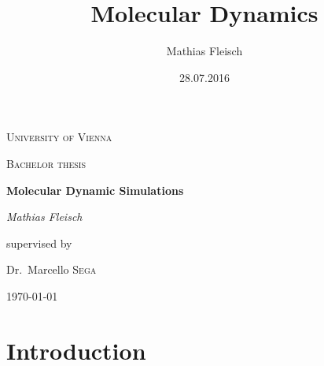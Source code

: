 \documentclass[a4paper]{article}
\title{Molecular Dynamics}
\date{28.07.2016}
\author{Mathias Fleisch}
\begin{document}
\begin{titlepage}
	\centering
	{\scshape\LARGE University of Vienna \par}
	\vspace{1cm}
	{\scshape\Large Bachelor thesis\par}
	\vspace{1.5cm}
	{\huge\bfseries Molecular Dynamic Simulations\par}
	\vspace{2cm}
	{\Large\itshape Mathias Fleisch\par}
	\vfill
	supervised by\par
	Dr.~Marcello \textsc{Sega}

	\vfill

	{\large \today\par}
\end{titlepage}

\newpage

\tableofcontents
\thispagestyle{empty}

\newpage
\setcounter{page}{1}

\section{Introduction}

\end{document}
